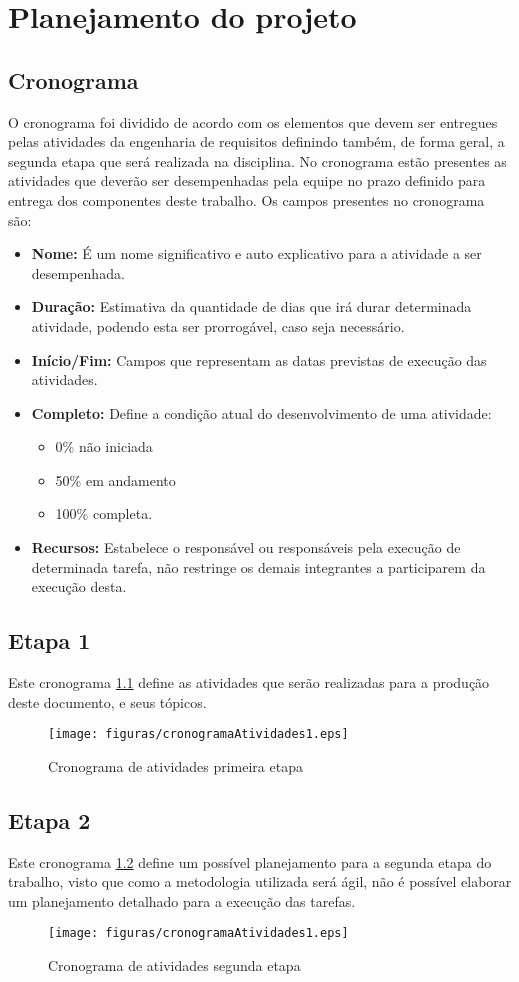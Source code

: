 \chapter[Planejamento do projet]{Planejamento do projeto}
\section{Cronograma}
O cronograma foi dividido de acordo com os elementos que devem ser entregues pelas atividades da engenharia de requisitos definindo também, de forma geral, a segunda etapa que será realizada na disciplina. No cronograma estão presentes as atividades que deverão ser desempenhadas pela equipe no prazo definido para entrega dos componentes deste trabalho.
Os campos presentes no cronograma são:
\begin{itemize}
\item \textbf{Nome:} É um nome significativo e auto explicativo para a atividade a ser desempenhada. 
\item \textbf{Duração:} Estimativa da quantidade de dias que irá durar determinada atividade, podendo esta ser prorrogável, caso seja necessário.
\item \textbf{Início/Fim:} Campos que representam as datas previstas de execução das atividades.
\item \textbf{Completo:} Define a condição atual do desenvolvimento de uma atividade:
    \begin{itemize}
        \item 0\% não iniciada
        \item  50\% em andamento
        \item 100\% completa.
    \end{itemize}
\item \textbf{Recursos:} Estabelece o responsável ou responsáveis pela execução de determinada tarefa, não restringe os demais integrantes a participarem da execução desta.
\end{itemize}
\section{Etapa 1}
Este cronograma \ref{cronograma1} define as atividades que serão realizadas para a produção deste documento, e seus tópicos.
\begin{figure}[H]
    \centering
    \label{cronograma1}
    \texttt{[image: figuras/cronogramaAtividades1.eps]}
    \caption{Cronograma de atividades primeira etapa}
\end{figure}
\section{Etapa 2}
Este cronograma \ref{cronograma2} define um possível planejamento para a segunda etapa do trabalho, visto que como a metodologia utilizada será ágil, não é possível elaborar um planejamento detalhado para a execução das tarefas.
\begin{figure}[H]
    \centering
    \label{cronograma2}
    \texttt{[image: figuras/cronogramaAtividades1.eps]}
    \caption{Cronograma de atividades segunda etapa}
\end{figure}
